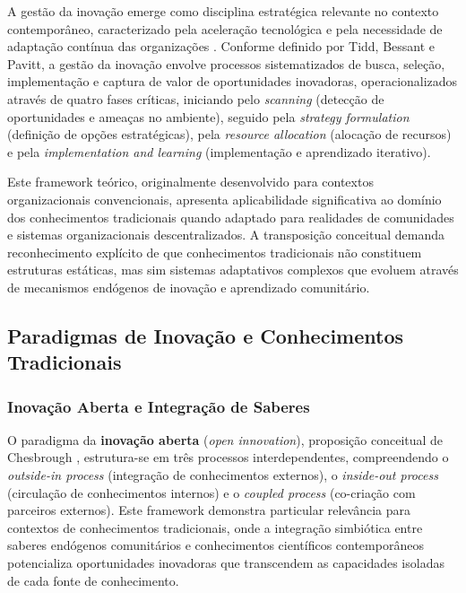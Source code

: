 A gestão da inovação emerge como disciplina estratégica relevante no contexto contemporâneo, caracterizado pela aceleração tecnológica e pela necessidade de adaptação contínua das organizações \cite{Tidd2005}. Conforme definido por Tidd, Bessant e Pavitt, a gestão da inovação envolve processos sistematizados de busca, seleção, implementação e captura de valor de oportunidades inovadoras, operacionalizados através de quatro fases críticas, iniciando pelo \textit{scanning} (detecção de oportunidades e ameaças no ambiente), seguido pela \textit{strategy formulation} (definição de opções estratégicas), pela \textit{resource allocation} (alocação de recursos) e pela \textit{implementation and learning} (implementação e aprendizado iterativo). 

Este framework teórico, originalmente desenvolvido para contextos organizacionais convencionais, apresenta aplicabilidade significativa ao domínio dos conhecimentos tradicionais quando adaptado para realidades de comunidades e sistemas organizacionais descentralizados. A transposição conceitual demanda reconhecimento explícito de que conhecimentos tradicionais não constituem estruturas estáticas, mas sim sistemas adaptativos complexos que evoluem através de mecanismos endógenos de inovação e aprendizado comunitário.

\subsection{Paradigmas de Inovação e Conhecimentos Tradicionais}

\subsubsection{Inovação Aberta e Integração de Saberes}

O paradigma da \textbf{inovação aberta} (\textit{open innovation}), proposição conceitual de Chesbrough \cite{Chesbrough2003}, estrutura-se em três processos interdependentes, compreendendo o \textit{outside-in process} (integração de conhecimentos externos), o \textit{inside-out process} (circulação de conhecimentos internos) e o \textit{coupled process} (co-criação com parceiros externos). Este framework demonstra particular relevância para contextos de conhecimentos tradicionais, onde a integração simbiótica entre saberes endógenos comunitários e conhecimentos científicos contemporâneos potencializa oportunidades inovadoras que transcendem as capacidades isoladas de cada fonte de conhecimento.


